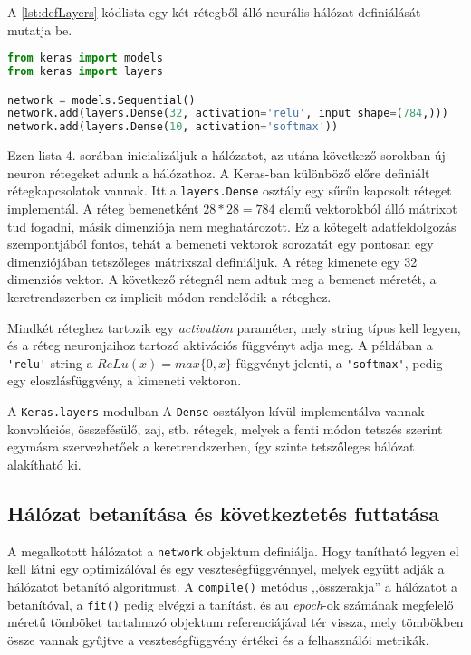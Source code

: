 A \ref{lst:defLayers} kódlista egy két rétegből álló neurális hálózat definiálását mutatja be.
\begin{minipage}{\linewidth}
\begin{lstlisting}[language=Python, caption=Két Neurális hálózat rétegeinek definiálása]
from keras import models
from keras import layers

network = models.Sequential()
network.add(layers.Dense(32, activation='relu', input_shape=(784,)))
network.add(layers.Dense(10, activation='softmax'))
\end{lstlisting}\label{lst:defLayers}
\end{minipage}
Ezen lista 4. sorában inicializáljuk a hálózatot, az utána következő sorokban új neuron rétegeket adunk a hálózathoz. A Keras-ban különböző előre definiált rétegkapcsolatok vannak. Itt a \verb|layers.Dense| osztály egy sűrűn kapcsolt réteget implementál. %
A réteg bemenetként $28 *28 = 784$ elemű vektorokból álló mátrixot tud fogadni, másik dimenziója nem meghatározott. Ez a kötegelt adatfeldolgozás szempontjából fontos, tehát a bemeneti vektorok sorozatát egy pontosan egy dimenziójában tetszőleges mátrixszal definiáljuk. A réteg kimenete egy 32 dimenziós vektor. A következő rétegnél nem adtuk meg a bemenet méretét, a keretrendszerben ez implicit módon rendelődik a réteghez. 

Mindkét réteghez tartozik egy \emph{activation} paraméter, mely string típus kell legyen, és a réteg neuronjaihoz tartozó aktivációs függvényt adja meg. A példában a \verb|'relu'| string a $ReLu(x) = max\{0,x\}$ függvényt jelenti, a \verb|'softmax'|, pedig egy eloszlásfüggvény, a kimeneti vektoron. %

A \verb|Keras.layers| modulban A \verb|Dense| osztályon kívül implementálva vannak konvolúciós, összefésülő, zaj, stb. rétegek, melyek a fenti módon tetszés szerint egymásra szervezhetőek a keretrendszerben, így szinte tetszőleges hálózat alakítható ki.

\subsection{Hálózat betanítása és következtetés futtatása}

A megalkotott hálózatot a \verb|network| objektum definiálja. Hogy tanítható legyen el kell látni egy optimizálóval és egy veszteségfüggvénnyel, melyek együtt adják a hálózatot betanító algoritmust. A \verb|compile()| metódus ,,összerakja'' a hálózatot a betanítóval, a \verb|fit()| pedig elvégzi a tanítást, és au \emph{epoch}-ok számának megfelelő méretű tömböket tartalmazó objektum referenciájával tér vissza, mely tömbökben össze vannak gyűjtve a veszteségfüggvény értékei és a felhasználói metrikák. 

